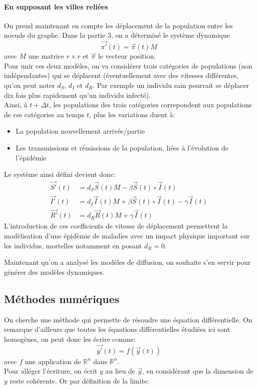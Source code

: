 \documentclass[a4paper]{article}
\theoremstyle{plain}
\theoremstyle{definition}
\theoremstyle{remark}
\begin{document}
\paragraph{En supposant les villes reliées} On prend maintenant en compte les déplacement de la population entre les noeuds du graphe. Dans la partie 3, on a déterminé le système dynamique 
$$\vec{\pi'}(t)=\vec{\pi}(t)M$$
avec $M$ une matrice $r\times r$ et $\vec{\pi}$ le vecteur position.\\
Pour unir ces deux modèles, on va considérer trois catégories de populations (non indépendantes) qui se déplacent (éventuellement avec des vitesses différentes, qu'on peut noter $d_S$, $d_I$ et $d_R$. Par exemple un individu sain pourrait se déplacer dix fois plus rapidement qu'un individu infecté).\\
Ainsi, à $t+\Delta t$, les populations des trois catégories correpondent aux populations de ces catégories au temps $t$, plus les variations duent à:
\begin{itemize}
    \item La population nouvellement arrivée/partie\\
    \item Les transmissions et rémissions de la population, liées à l'évolution de l'épidémie\\
\end{itemize}
Le système ainsi défini devient donc:
\begin{align}
    \vec{S'}(t)&=d_S\vec{S}(t)M-\beta \vec{S}(t)\circ\vec{I}(t)\\
   \vec{I'}(t)&=d_I\vec{I}(t)M+\beta \vec{S}(t)\circ\vec{I}(t)-\gamma \vec{I}(t)\\
    \vec{R'}(t)&=d_R\vec{R}(t)M+\gamma \vec{I}(t)
\end{align}
L'introduction de ces coefficients de vitesse de déplacement permettent la modèlisation d'une épidèmie de maladies avec un impact physique important sur les individus, mortelles notamment en posant $d_R=0$.

Maintenant qu'on a analysé les modèles de diffusion, on souhaite s'en servir pour générer des modèles dynamiques.
\subsection{Méthodes numériques}
On cherche une méthode qui permette de résoudre une équation différentielle. On remarque d'ailleurs que toutes les équations différentielles étudiées ici sont homogènes, on peut donc les écrire comme:
$$\vec{y'}(t)=f(\vec{y}(t))$$
avec $f$ une application de $\mathbb{R}^n$ dans $\mathbb{R}^n$.\\
Pour alléger l'écriture, on écrit $y$ au lieu de $\vec{y}$, en considérant que la dimension de $y$ reste cohérente.
Or par définition de la limite: 
\end{document}
